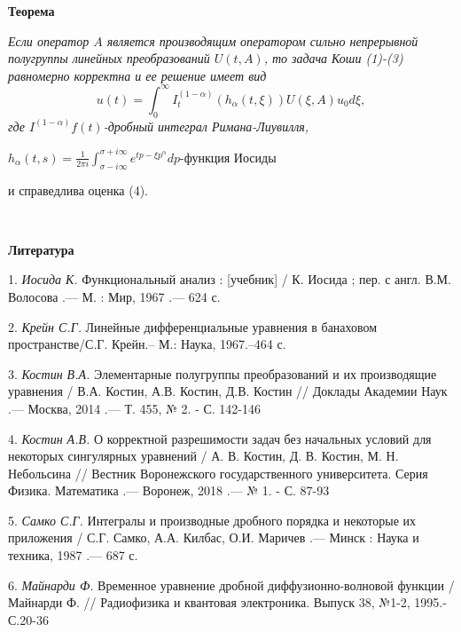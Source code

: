  \textbf{ Теорема } {\it Если оператор $A$ является производящим оператором сильно непрерывной полугруппы линейных  преобразований $U(t,A)$, то задача Коши (1)-(3) равномерно корректна и ее решение имеет вид
 $$u(t)=\int_{0}^{\infty}I_{t}^{(1-\alpha)}(h_{\alpha}(t,\xi))U(\xi,A)u_{0}d\xi,$$
 где $I^{(1-\alpha)}f(t)$-дробный интеграл Римана-Лиувилля,

 $h_{\alpha}(t,s)=\frac{1}{2\pi i}\int_{\sigma-i\infty}^{\sigma+i \infty}e^{tp-\xi p^{\alpha}}dp$-функция Иосиды

 и справедлива оценка (4).}


\


\smallskip \centerline {\bf Литература} \nopagebreak

1. {\it Иосида К.} Функциональный анализ : [учебник] / К. Иосида ; пер. с англ. В.М. Волосова .— М. : Мир, 1967 .— 624 с.

2. {\it Крейн С.Г.} Линейные дифференциальные уравнения в банаховом
пространстве/С.Г. Крейн.-- М.: Наука, 1967.--464 с.

3. {\it Костин В.А.} Элементарные полугруппы преобразований и их производящие уравнения / В.А. Костин, А.В. Костин, Д.В. Костин // Доклады Академии Наук .— Москва, 2014 .— Т. 455, № 2. - С. 142-146

4. {\it Костин А.В.} О корректной разрешимости задач без начальных условий для некоторых сингулярных уравнений / А. В. Костин, Д. В. Костин, М. Н. Небольсина // Вестник Воронежского государственного университета. Серия Физика. Математика .— Воронеж, 2018 .— № 1. - С. 87-93

5. {\it Самко С.Г.} Интегралы и производные дробного порядка и некоторые их приложения / С.Г. Самко, А.А. Килбас, О.И. Маричев .— Минск : Наука и техника, 1987 .— 687 с.

6. {\it Майнарди Ф.} Временное уравнение дробной диффузионно-волновой функции /Майнарди Ф. // Радиофизика и квантовая электроника. Выпуск 38, №1-2, 1995.-С.20-36


